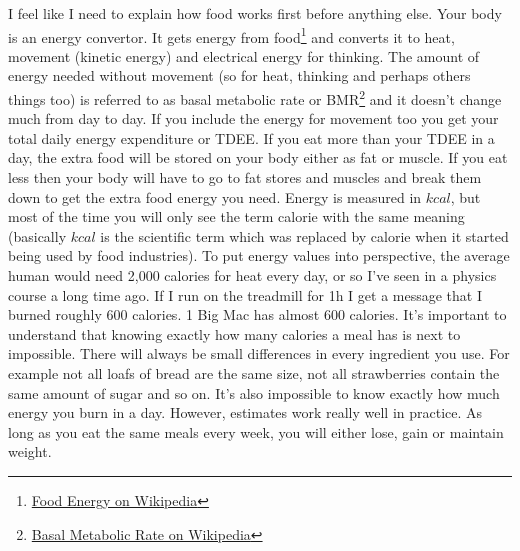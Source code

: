 \documentclass[openany, 12pt]{book}
\begin{document}
	I feel like I need to explain how food works first before anything else. Your body is an energy convertor. It gets energy from food\footnote{\href{https://en.wikipedia.org/wiki/Food_energy}{Food Energy on Wikipedia}} and converts it to heat, movement (kinetic energy) and 
	electrical energy for thinking. The amount of energy needed without movement (so for heat, thinking and perhaps others things too) is referred 
	to as basal metabolic rate or BMR\footnote{\href{https://en.wikipedia.org/wiki/Basal_metabolic_rate}{Basal Metabolic Rate on Wikipedia}} and it
	doesn't change much from day to day. If you include the energy for movement too you get your total daily energy expenditure or TDEE. If you eat
	more than your TDEE in a day, the extra food will be stored on your body either as fat or muscle. If you eat less then your body will have to go
	to fat stores and muscles and break them down to get the extra food energy you need. Energy is measured in $kcal$, but most of the time you will
	only see the term calorie with the same meaning (basically $kcal$ is the scientific term which was replaced by calorie when it started being used
	by food industries). To put energy values into perspective, the average human would need 2,000 calories for heat every day, or so I've seen in a
	physics course a long time ago. If I run on the treadmill for 1h I get a message that I burned roughly 600 calories. 1 Big Mac has almost 600 calories.
        It's important to understand that knowing exactly how many calories a meal has is next to impossible. There will always be small differences in every
        ingredient you use. For example not all loafs of bread are the same size, not all strawberries contain the same amount of sugar and so on. It's also
        impossible to know exactly how much energy you burn in a day. However, estimates work really well in practice. As long as you eat the same meals every week,
        you will either lose, gain or maintain weight.
	
\end{document}
